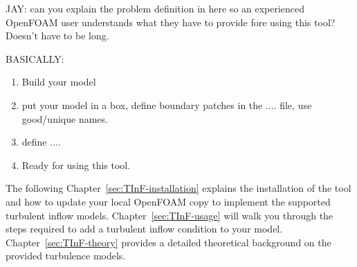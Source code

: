 
JAY: can you explain the problem definition in here so an experienced OpenFOAM user understands what they have to provide fore using this tool?  Doesn't have to be long.

BASICALLY: 
\begin{enumerate}
\item
   Build your model
   
\item
   put your model in a box, define boundary patches in the .... file, use good/unique names.
   
\item
    define ....
    
\item 
    Ready for using this tool.
    
\end{enumerate}



The following Chapter~\ref{sec:TInF-installation} explains the installation of the tool and how to update your local OpenFOAM copy to implement the supported turbulent inflow models.
Chapter~\ref{sec:TInF-usage} will walk you through the steps required to add a turbulent inflow condition to your model.
Chapter~\ref{sec:TInF-theory} provides a detailed theoretical background on the provided turbulence models.
